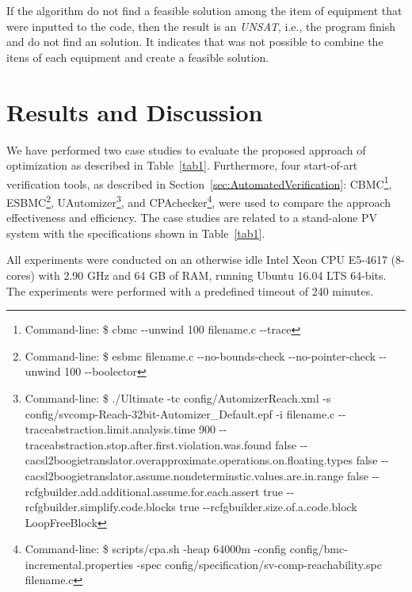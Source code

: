 \documentclass[10pt,conference]{IEEEtran}
\begin{document}
If the algorithm do not find a feasible solution among the item of equipment that were inputted to the code, then the result is an \textit{UNSAT}, i.e., the program finish and do not find an solution. It indicates that was not possible to combine the itens of each equipment and create a feasible solution.

\section{Results and Discussion}
We have performed two case studies to evaluate the proposed approach of optimization as described in Table~\ref{tab1}. Furthermore, four start-of-art verification tools, as described in Section~\ref{sec:AutomatedVerification}: CBMC\footnote{Command-line: \$ cbmc -\phantom{}-unwind 100 filename.c -\phantom{}-trace}, ESBMC\footnote{Command-line: \$ esbmc filename.c -\phantom{}-no-bounds-check -\phantom{}-no-pointer-check -\phantom{}-unwind 100 -\phantom{}-boolector}, UAutomizer\footnote{Command-line: \$ ./Ultimate -tc config/AutomizerReach.xml -s config/svcomp-Reach-32bit-Automizer\_Default.epf -i filename.c -\phantom{}-traceabstraction.limit.analysis.time 900 -\phantom{}-traceabstraction.stop.after.first.violation.was.found false -\phantom{}-cacsl2boogietranslator.overapproximate.operations.on.floating.types false -\phantom{}- cacsl2boogietranslator.assume.nondeterminstic.values.are.in.range false -\phantom{}-rcfgbuilder.add.additional.assume.for.each.assert true -\phantom{}-rcfgbuilder.simplify.code.blocks true -\phantom{}-rcfgbuilder.size.of.a.code.block LoopFreeBlock}, and CPAchecker\footnote{Command-line: \$ scripts/cpa.sh -heap 64000m -config config/bmc-incremental.properties -spec config/specification/sv-comp-reachability.spc filename.c}, were used to compare the approach effectiveness and efficiency. The case studies are related to a stand-alone PV system with the specifications shown in Table~\ref{tab1}.

All experiments were conducted on an otherwise idle Intel Xeon CPU E5-4617 (8-cores) with 2.90 GHz and 64 GB of RAM, running Ubuntu 16.04 LTS 64-bits. The experiments were performed with a predefined timeout of 240 minutes.
\end{document}
